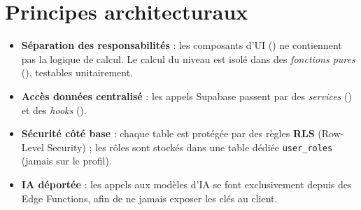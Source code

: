 \section{Principes architecturaux}
\begin{itemize}
  \item \textbf{Séparation des responsabilités} : les composants d'UI
        () ne contiennent pas la logique de calcul.
        Le calcul du niveau est isolé dans des \emph{fonctions pures}
        (), testables unitairement.
  \item \textbf{Accès données centralisé} : les appels Supabase passent par des
        \emph{services} () et des \emph{hooks}
        ().
  \item \textbf{Sécurité côté base} : chaque table est protégée par des règles
        \textbf{RLS} (Row-Level Security) ; les rôles sont stockés dans une table
        dédiée \texttt{user\_roles} (jamais sur le profil).
  \item \textbf{IA déportée} : les appels aux modèles d'IA se font exclusivement
        depuis des Edge Functions, afin de ne jamais exposer les clés au client.
\end{itemize}


